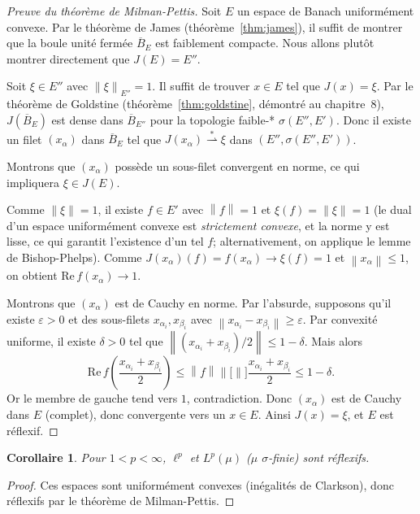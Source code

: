 \documentclass[a4paper,12pt]{book}
\newcommand{\norm}[1]{\left\| #1 \right\|}
\newcommand{\weakstarto}{\overset{*}{\rightharpoonup}}
\theoremstyle{definition}
\theoremstyle{plain}
\newtheorem{corollaire}[definition]{Corollaire}
\theoremstyle{remark}
\begin{document}
\begin{proof}[Preuve du théorème de Milman-Pettis]
Soit $E$ un espace de Banach uniformément convexe. Par le théorème de James
(théorème~\ref{thm:james}), il suffit de montrer que la boule unité fermée
$\overline{B}_E$ est faiblement compacte. Nous allons plutôt montrer directement
que $J(E) = E''$.

Soit $\xi \in E''$ avec $\norm{\xi}_{E''} = 1$. Il suffit de trouver $x \in E$ tel
que $J(x) = \xi$. Par le théorème de Goldstine (théorème~\ref{thm:goldstine},
démontré au chapitre~8), $J(\overline{B}_E)$ est dense dans $\overline{B}_{E''}$
pour la topologie faible-* $\sigma(E'', E')$.
Donc il existe un filet $(x_\alpha)$ dans $\overline{B}_E$ tel que
$J(x_\alpha) \weakstarto \xi$ dans $(E'', \sigma(E'', E'))$.

Montrons que $(x_\alpha)$ possède un sous-filet convergent en norme, ce qui impliquera
$\xi \in J(E)$.

Comme $\norm{\xi} = 1$, il existe $f \in E'$ avec $\norm{f} = 1$ et
$\xi(f) = \norm{\xi} = 1$ (le dual d'un espace uniformément convexe est
\emph{strictement convexe}, et la norme y est lisse,
ce qui garantit l'existence d'un tel $f$; alternativement, on applique
le lemme de Bishop-Phelps).
Comme $J(x_\alpha)(f) = f(x_\alpha) \to \xi(f) = 1$ et $\norm{x_\alpha} \le 1$,
on obtient $\mathrm{Re}\, f(x_\alpha) \to 1$.

Montrons que $(x_\alpha)$ est de Cauchy en norme. Par l'absurde, supposons qu'il
existe $\varepsilon > 0$ et des sous-filets $x_{\alpha_i}, x_{\beta_i}$ avec
$\norm{x_{\alpha_i} - x_{\beta_i}} \ge \varepsilon$. Par convexité uniforme, il
existe $\delta > 0$ tel que $\norm{(x_{\alpha_i} + x_{\beta_i})/2} \le 1 - \delta$.
Mais alors
\[
  \mathrm{Re}\, f\!\left(\frac{x_{\alpha_i} + x_{\beta_i}}{2}\right) \le
  \norm{f} \norm[\bigg]{\frac{x_{\alpha_i} + x_{\beta_i}}{2}} \le 1 - \delta.
\]
Or le membre de gauche tend vers $1$, contradiction. Donc $(x_\alpha)$ est de Cauchy
dans $E$ (complet), donc convergente vers un $x \in E$.
Ainsi $J(x) = \xi$, et $E$ est réflexif.
\end{proof}

\begin{corollaire}
\label{cor:lp-reflexif-milman}
Pour $1 < p < \infty$, $\ell^p$ et $L^p(\mu)$ ($\mu$ $\sigma$-finie) sont réflexifs.
\end{corollaire}

\begin{proof}
Ces espaces sont uniformément convexes (inégalités de Clarkson),
donc réflexifs par le théorème de Milman-Pettis.
\end{proof}
\end{document}
